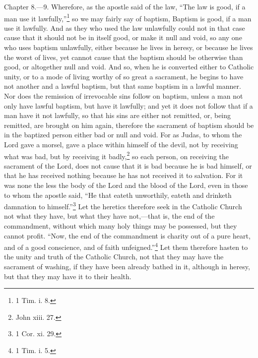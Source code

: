 Chapter 8.—9. Wherefore, as the apostle said of the law, ``The law is good, if a man use it lawfully,''\footnote{\par  1 Tim. i. 8.} so we may fairly say of baptism, Baptism is good, if a man use it lawfully. And as they who used the law unlawfully could not in that case cause that it should not be in itself good, or make it null and void, so any one who uses baptism unlawfully, either because he lives in heresy, or because he lives the worst of lives, yet cannot cause that the baptism should be otherwise than good, or altogether null and void. And so, when he is converted either to Catholic unity, or to a mode of living worthy of so great a sacrament, he begins to have not another and a lawful baptism, but that same baptism in a lawful manner. Nor does the remission of irrevocable sins follow on baptism, unless a man not only have lawful baptism, but have it lawfully; and yet it does not follow that if a man have it not lawfully, so that his sins are either not remitted, or, being remitted, are brought on him again, therefore the sacrament of baptism should be in the baptized person either bad or null and void. For as Judas, to whom the Lord gave a morsel, gave a place within himself of the devil, not by receiving what was bad, but by receiving it badly,\footnote{\par  John xiii. 27.} so each person, on receiving the sacrament of the Lord, does not cause that it is bad because he is bad himself, or that he has received nothing because he has not received it to salvation. For it was none the less the body of the Lord and the blood of the Lord, even in those to whom the apostle said, ``He that eateth unworthily, eateth and drinketh damnation to himself.''\footnote{\par  1 Cor. xi. 29.} \textsuperscript{ } Let the heretics therefore seek in the Catholic Church not what they have, but what they have not,—that is, the end of the commandment, without which many holy things may be possessed, but they cannot profit. ``Now, the end of the commandment is charity out of a pure heart, and of a good conscience, and of faith unfeigned.''\footnote{\par  1 Tim. i. 5.} Let them therefore hasten to the unity and truth of the Catholic Church, not that they may have the sacrament of washing, if they have been already bathed in it, although in heresy, but that they may have it to their health.


